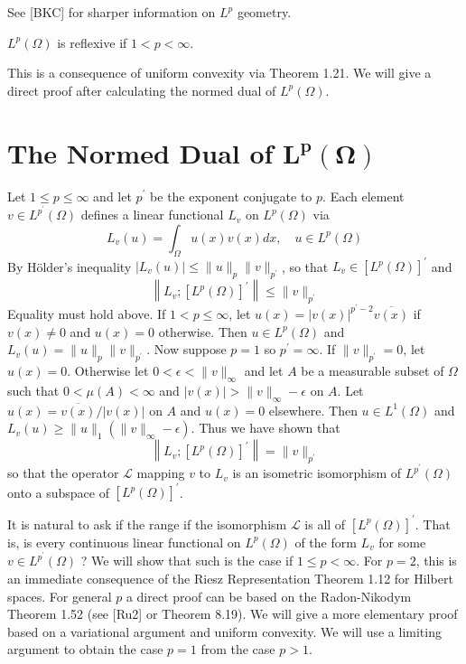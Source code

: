 See [BKC] for sharper information on $L^p$ geometry.

\begin{corollary}\label{cor:2.40}
  $L^p(\Omega)$ is reflexive if $1<p<\infty$.
\end{corollary}
This is a consequence of uniform convexity via Theorem 1.21.
We will give a direct proof after calculating the normed dual of $L^p(\Omega)$.


\section[The Normed Dual of $L^p(\Omega)$]{The Normed Dual of $\bm{L^p(\Omega)}$}


\begin{para}
  Let $1 \leq p \leq \infty$ and let $p^{\prime}$ be the exponent conjugate to $p$.
  Each element $v \in L^{p^{\prime}}(\Omega)$ defines a linear functional
  $L_v$ on $L^p(\Omega)$ via
  \[
  L_v(u)=\int_{\Omega} u(x) v(x) d x, \quad u \in L^p(\Omega)
  \]
  By Hölder's inequality $\left|L_v(u)\right| \leq\|u\|_p\|v\|_{p^{\prime}}$, so that $L_v \in\left[L^p(\Omega)\right]^{\prime}$ and
  \[
  \left\|L_v ;\left[L^p(\Omega)\right]^{\prime}\right\| \leq\|v\|_{p^{\prime}}
  \]
  Equality must hold above. If $1<p \leq \infty$, let $u(x)=|v(x)|^{p^{\prime}-2} \overline{v(x)}$ if $v(x) \neq 0$ and $u(x)=0$ otherwise. Then $u \in L^p(\Omega)$ and $L_v(u)=\|u\|_p\|v\|_{p^{\prime}}$.
  Now suppose $p=1$ so $p^{\prime}=\infty$. If $\|v\|_{p^{\prime}}=0$, let $u(x)=0$. Otherwise let $0<\epsilon<\|v\|_{\infty}$ and let $A$ be a measurable subset of $\Omega$ such that $0<\mu(A)<\infty$
  and $|v(x)|>\|v\|_{\infty}-\epsilon$ on $A$. Let $u(x)=\overline{v(x)} /|v(x)|$ on $A$ and $u(x)=0$ elsewhere. Then $u \in L^1(\Omega)$ and $L_v(u) \geq\|u\|_1\left(\|v\|_{\infty}-\epsilon\right)$. Thus we have shown that
  \[
  \left\|L_v ;\left[L^p(\Omega)\right]^{\prime}\right\|=\|v\|_{p^{\prime}}
  \]
  so that the operator $\mathcal{L}$ mapping $v$ to $L_v$ is an isometric isomorphism of $L^{p^{\prime}}(\Omega)$ onto a subspace of $\left[L^p(\Omega)\right]^{\prime}$.
\end{para}


\begin{para}
  It is natural to ask if the range if the isomorphism $\mathcal{L}$ is all of $\left[L^p(\Omega)\right]^{\prime}$. That is, is every continuous linear functional on $L^p(\Omega)$ of the form $L_v$ for some $v \in L^{p^{\prime}}(\Omega)$ ? We will show that such is the case if $1 \leq p<\infty$. For $p=2$, this is an immediate consequence of the Riesz Representation Theorem 1.12 for Hilbert spaces. For general $p$ a direct proof can be based on the Radon-Nikodym Theorem 1.52 (see [Ru2] or Theorem 8.19). We will give a more elementary proof based on a variational argument and uniform convexity. We will use a limiting argument to obtain the case $p=1$ from the case $p>1$.
\end{para}


